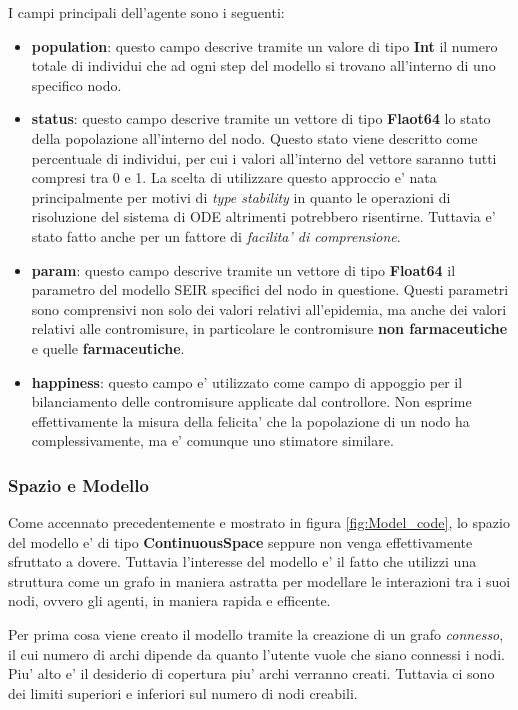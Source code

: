 I campi principali dell'agente sono i seguenti:
\begin{itemize}
	\item \textbf{population}: questo campo descrive tramite un valore di tipo \textbf{Int}
	il numero totale di individui che ad ogni step del modello si trovano all'interno di uno 
	specifico nodo. 
	\item \textbf{status}: questo campo descrive tramite un vettore di tipo \textbf{Flaot64}
	lo stato della popolazione all'interno del nodo. Questo stato viene descritto come 
	percentuale di individui, per cui i valori all'interno del vettore saranno tutti compresi 
	tra 0 e 1. La scelta di utilizzare questo approccio e' nata principalmente per motivi di 
	\emph{type stability} in quanto le operazioni di risoluzione del sistema di ODE altrimenti 
	potrebbero risentirne. Tuttavia e' stato fatto anche per un fattore di \emph{facilita' di comprensione}.
	\item \textbf{param}: questo campo descrive tramite un vettore di tipo \textbf{Float64}
	il parametro del modello SEIR specifici del nodo in questione. Questi parametri sono comprensivi 
	non solo dei valori relativi all'epidemia, ma anche dei valori relativi alle contromisure, 
	in particolare le contromisure \textbf{non farmaceutiche} e quelle \textbf{farmaceutiche}.
	\item \textbf{happiness}: questo campo e' utilizzato come campo di appoggio per il bilanciamento
	delle contromisure applicate dal controllore. Non esprime effettivamente la misura della felicita'
	che la popolazione di un nodo ha complessivamente, ma e' comunque uno stimatore similare.
\end{itemize}

\subsubsection*{Spazio e Modello}
Come accennato precedentemente e mostrato in figura \ref{fig:Model_code}, lo spazio del modello 
e' di tipo \textbf{ContinuousSpace} seppure non venga effettivamente sfruttato a dovere. 
Tuttavia l'interesse del modello e' il fatto che utilizzi una struttura come un grafo in maniera
astratta per modellare le interazioni tra i suoi nodi, ovvero gli agenti, in maniera rapida e efficente.

Per prima cosa viene creato il modello tramite la creazione di un grafo \emph{connesso}, il cui 
numero di archi dipende da quanto l'utente vuole che siano connessi i nodi. Piu' alto e' il 
desiderio di copertura piu' archi verranno creati. Tuttavia ci sono dei limiti superiori e inferiori 
sul numero di nodi creabili.

